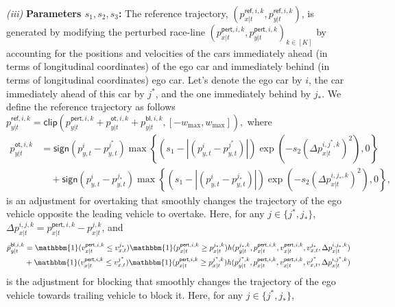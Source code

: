 \textit{(iii)} \textbf{Parameters \(s_1, s_2, s_3\):}  
    The reference trajectory, \((p_{x|t}^{\textsf{ref},i,k}, p_{y|t}^{\textsf{ref},i,k})\), is generated by modifying the perturbed race-line  \((p_{x|t}^{\textsf{pert},i,k}, p_{y|t}^{\textsf{pert},i,k})_{k\in[K]}\) by accounting for the positions and velocities of the cars immediately ahead (in terms of longitudinal coordinates) of the ego car and immediately behind (in terms of longitudinal coordinates) ego car. Let's denote the ego car by \(i\), the car immediately ahead of this car by \(j^\ast\), and the one immediately behind by \(j_\ast\). We define the reference trajectory as follows \(p_{y|t}^{\textsf{ref}, i,k} = \textsf{clip}({p}_{y|t}^{\textsf{pert}, i, k} + {p}_{y|t}^{\textsf{ot}, i, k} +  {p}_{y|t}^{\textsf{bl},i,k}, [-w_{\max},w_{\max}]),\)
    where 
\begin{align*}
{p}_{y|t}^{\textsf{ot},i,k} & = \textsf{sign}({p}_{y,t}^i - {p}_{y,t}^{j^\ast})
            \max\left\{(s_1-  |({p}_{y,t}^i - {p}_{y,t}^{j^\ast})|) \exp\left(-s_2 \left(\Delta p_{x|t}^{i,j^\ast,k}\right)^2 \right)  , 0\right \}  \\ 
            & \quad + \textsf{sign}({p}_{y,t}^i - {p}_{y,t}^{j_\ast})
            \max\left\{(s_1- |({p}_{y,t}^i - {p}_{y,t}^{j_\ast})|)\exp\left(-s_2 \left(\Delta p_{x|t}^{i,j_\ast,k}\right)^2 \right) , 0\right \}, 
    \end{align*}
    is an adjustment for overtaking that smoothly changes the trajectory of the ego vehicle opposite the leading vehicle to overtake. Here, for any \(j\in \{j^\ast, j_\ast\}\),
 \(\Delta p_{x|t}^{i,j,k} 
 = p_{x|t}^{\textsf{pert},i,k} - p_{x|t}^{j,k}\), and
\begin{align*}
    \bar{p}_{y|t}^{\textsf{bl},i,k} &= \mathbbm{1}(v_{x|t}^{\textsf{pert},i,k}\leq v_{x,t}^{j_\ast})\mathbbm{1}(p_{x|t}^{\textsf{pert},i,k}\geq p_{x|t}^{j_\ast,k}) h(p_{y|t}^{j_\ast,k}, p_{x|t}^{\textsf{pert},i,k},v_{x|t}^{\textsf{pert},i,k},v_{x,t}^{j_\ast},\Delta p_{x|t}^{i,j_\ast,k})\\
    &+\mathbbm{1}(v_{x|t}^{\textsf{pert},i,k}\leq v_{x,t}^{j^\ast})\mathbbm{1}(p_{x|t}^{\textsf{pert},i,k}\geq p_{x|t}^{j^\ast,k}) h(p_{y|t}^{j^\ast,k}, p_{x|t}^{\textsf{pert},i,k},v_{x|t}^{\textsf{pert},i,k},v_{x,t}^{j^\ast},\Delta p_{x|t}^{i,j^\ast,k})
\end{align*}
\noindent is the adjustment for blocking that smoothly changes the trajectory of the ego vehicle towards trailing vehicle to block it. Here, for any \(j\in \{j^\ast, j_\ast\}\),
